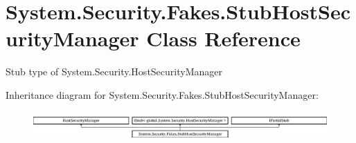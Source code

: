 \hypertarget{class_system_1_1_security_1_1_fakes_1_1_stub_host_security_manager}{\section{System.\-Security.\-Fakes.\-Stub\-Host\-Security\-Manager Class Reference}
\label{class_system_1_1_security_1_1_fakes_1_1_stub_host_security_manager}
}


Stub type of System.\-Security.\-Host\-Security\-Manager 


Inheritance diagram for System.\-Security.\-Fakes.\-Stub\-Host\-Security\-Manager\-:\begin{figure}[H]
\begin{center}
\leavevmode
\includegraphics[height=1.138211cm]{class_system_1_1_security_1_1_fakes_1_1_stub_host_security_manager}
\end{center}
\end{figure}
